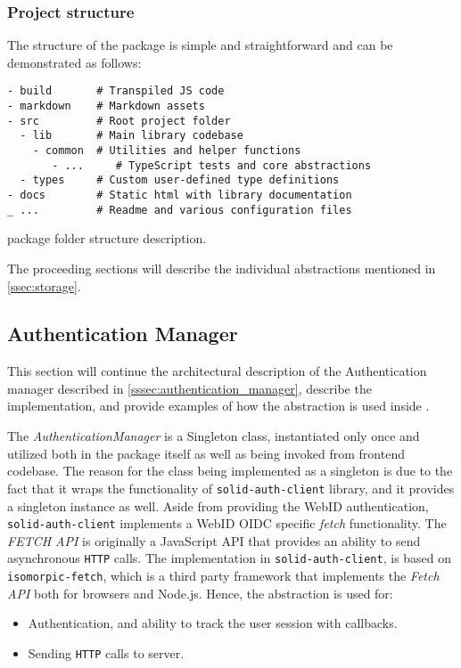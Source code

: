 \subsubsection{Project structure}

The structure of the \lpas{} package is simple and straightforward and can be demonstrated as follows:

\begin{listing}[H]    
\begin{verbatim}
- build       # Transpiled JS code    
- markdown    # Markdown assets
- src         # Root project folder
  - lib       # Main library codebase
    - common  # Utilities and helper functions
       - ...     # TypeScript tests and core abstractions
  - types     # Custom user-defined type definitions
- docs        # Static html with library documentation
_ ...         # Readme and various configuration files
\end{verbatim}
\caption{\lpas{} package folder structure description.} 
\label{lst:lpas_folder_structure}
\end{listing}

The proceeding sections will describe the individual abstractions mentioned in \autoref{ssec:storage}.

\subsection{Authentication Manager}
\label{sssec:authentication_manager_implementation}

This section will continue the architectural description of the Authentication manager described in \autoref{sssec:authentication_manager}, describe the implementation, and provide examples of how the abstraction is used inside \lpa{}.

The \textit{AuthenticationManager} is a Singleton class, instantiated only once and utilized both in the package itself as well as being invoked from \lpa{} frontend codebase. The reason for the class being implemented as a singleton is due to the fact that it wraps the functionality of \texttt{solid-auth-client} library, and it provides a singleton instance as well. Aside from providing the WebID authentication,  \texttt{solid-auth-client} implements a WebID OIDC specific \textit{fetch} functionality. The \textit{FETCH API} is originally a JavaScript API that provides an ability to send asynchronous \texttt{HTTP} calls. The implementation in \texttt{solid-auth-client}, is based on \texttt{isomorpic-fetch}, which is a third party framework that implements the \textit{Fetch API} both for browsers and Node.js. Hence, the abstraction is used for:
\begin{itemize}
    \item Authentication, and ability to track the user session with callbacks. 
    \item Sending \texttt{HTTP} calls to \solid{} server.
\end{itemize}


